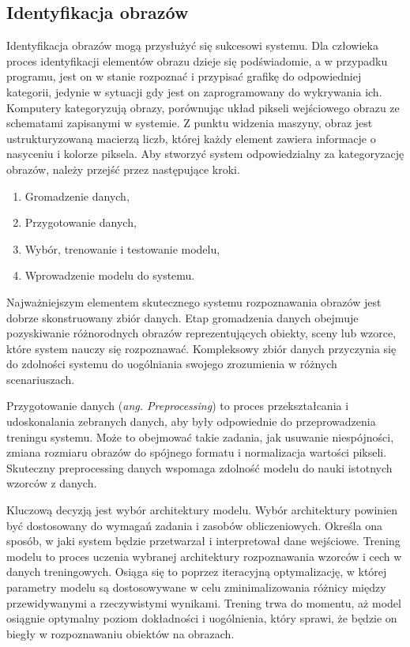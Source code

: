 \documentclass[12pt,a4paper,twoside]{article}
\begin{document}
\subsection{Identyfikacja obrazów}
Identyfikacja obrazów mogą przysłużyć się sukcesowi systemu. Dla człowieka proces identyfikacji elementów obrazu dzieje się podświadomie, a w przypadku programu, jest on w stanie rozpoznać i przypisać grafikę do odpowiedniej kategorii, jedynie w sytuacji gdy jest on zaprogramowany do wykrywania ich. Komputery kategoryzują obrazy, porównując układ pikseli wejściowego obrazu ze schematami zapisanymi w systemie. Z punktu widzenia maszyny, obraz jest ustrukturyzowaną macierzą liczb, której każdy element zawiera informacje o nasyceniu i kolorze piksela. Aby stworzyć system odpowiedzialny za kategoryzację obrazów, należy przejść przez następujące kroki.
\begin{enumerate}
	\item Gromadzenie danych,
	\item Przygotowanie danych,
	\item Wybór, trenowanie i testowanie modelu,
	\item Wprowadzenie modelu do systemu.
\end{enumerate}
Najważniejszym elementem skutecznego systemu rozpoznawania obrazów jest dobrze skonstruowany zbiór danych. Etap gromadzenia danych obejmuje pozyskiwanie różnorodnych obrazów reprezentujących obiekty, sceny lub wzorce, które system nauczy się rozpoznawać. Kompleksowy zbiór danych przyczynia się do zdolności systemu do uogólniania swojego zrozumienia w różnych scenariuszach.\par
Przygotowanie danych (\textit{ang. Preprocessing}) to proces przekształcania i udoskonalania zebranych danych, aby były odpowiednie do przeprowadzenia treningu systemu. Może to obejmować takie zadania, jak usuwanie niespójności, zmiana rozmiaru obrazów do spójnego formatu i normalizacja wartości pikseli. Skuteczny preprocessing danych wspomaga zdolność modelu do nauki istotnych wzorców z danych.\par
Kluczową decyzją jest wybór architektury modelu. Wybór architektury powinien być dostosowany do wymagań zadania i zasobów obliczeniowych. Określa ona sposób, w jaki system będzie przetwarzał i interpretował dane wejściowe. Trening modelu to proces uczenia wybranej architektury rozpoznawania wzorców i cech w danych treningowych. Osiąga się to poprzez iteracyjną optymalizację, w której parametry modelu są dostosowywane w celu zminimalizowania różnicy między przewidywanymi a rzeczywistymi wynikami. Trening trwa do momentu, aż model osiągnie optymalny poziom dokładności i uogólnienia, który sprawi, że będzie on biegły w rozpoznawaniu obiektów na obrazach. \par
\end{document}
